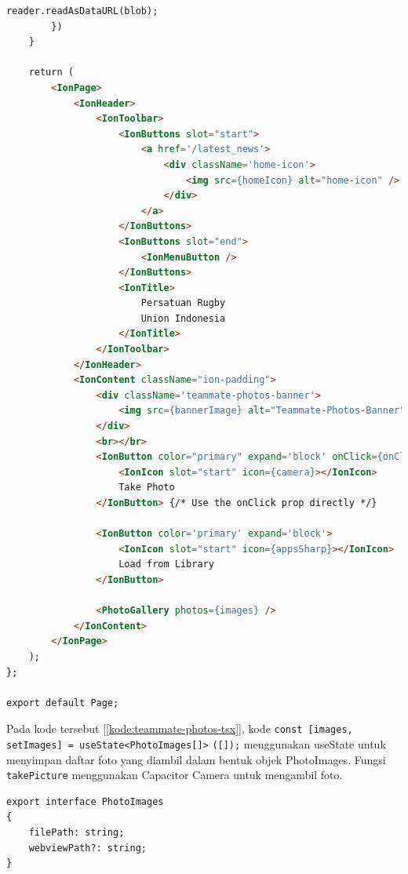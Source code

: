\begin{lstlisting}[language=HTML, caption=Kode dari teammate\_photos.tsx, label=kode:teammate-photos-tsx]
            reader.readAsDataURL(blob);
        })
    }

    return (
        <IonPage>
            <IonHeader>
                <IonToolbar>
                    <IonButtons slot="start">
                        <a href='/latest_news'>
                            <div className='home-icon'>
                                <img src={homeIcon} alt="home-icon" />
                            </div>
                        </a>                     
                    </IonButtons>
                    <IonButtons slot="end">
                        <IonMenuButton />
                    </IonButtons>
                    <IonTitle>
                        Persatuan Rugby
                        Union Indonesia
                    </IonTitle>
                </IonToolbar>
            </IonHeader>
            <IonContent className="ion-padding">
                <div className='teammate-photos-banner'>
                    <img src={bannerImage} alt="Teammate-Photos-Banner" />
                </div>
                <br></br>
                <IonButton color="primary" expand='block' onClick={onClick => takePicture()}>
                    <IonIcon slot="start" icon={camera}></IonIcon>
                    Take Photo
                </IonButton> {/* Use the onClick prop directly */}

                <IonButton color='primary' expand='block'>
                    <IonIcon slot="start" icon={appsSharp}></IonIcon>
                    Load from Library
                </IonButton>

                <PhotoGallery photos={images} />
            </IonContent>
        </IonPage>
    );
};

export default Page;

\end{lstlisting}

Pada kode tersebut [\ref{kode:teammate-photos-tsx}], kode \texttt{const [images, setImages] = useState<PhotoImages[]>} \texttt{([]);} menggunakan useState untuk menyimpan daftar foto yang diambil dalam bentuk objek PhotoImages. Fungsi \texttt{takePicture} menggunakan Capacitor Camera untuk mengambil foto. 

\begin{lstlisting}[language=HTML, caption=Kode dari photoImages.tsx, label=kode:photo-image-tsx]
export interface PhotoImages
{
    filePath: string;
    webviewPath?: string;
}

\end{lstlisting}

